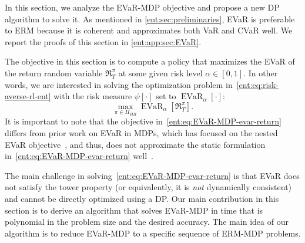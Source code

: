 \documentclass[twoside]{article}
\newcommand{\evar}[2]{\operatorname{EVaR}_{#1} \left[#2\right]}
\theoremstyle{plain}
\theoremstyle{definition}
\theoremstyle{remark}
\renewcommand{\cite}[1]{\citep{#1}}
\begin{document}
In this section, we analyze the EVaR-MDP objective and propose a new DP algorithm to solve it. As mentioned in \cref{ent:sec:preliminaries}, EVaR is preferable to ERM because it is coherent and approximates both VaR and CVaR well. We report the proofs of this section in \cref{ent:app:sec:EVaR}.

The objective in this section is to compute a policy that maximizes the EVaR of the return random variable $\mathfrak{R}_T^\pi$ at some given risk level $\alpha \in [0,1]$. In other words, we are interested in solving the optimization problem in~\eqref{ent:eq:risk-averse-rl-ent} with the risk measure $\psi[\cdot]$ set to $\evar{\alpha}{\cdot}$:
%
\begin{equation} \label{ent:eq:EVaR-MDP-evar-return}
\max_{\pi\in\Pi_{HR}}  \evar{\alpha}{ \mathfrak{R}_{T}^\pi } .
\end{equation}
%
It is important to note that the objective in~\eqref{ent:eq:EVaR-MDP-evar-return} differs from prior work on EVaR in MDPs, which has focused on the nested EVaR objective~\cite{Ahmadi2021a,Ahmadi2021b,Dixit2021}, and thus, does not approximate the static formulation in~\eqref{ent:eq:EVaR-MDP-evar-return} well~\cite{Iancu2015}.

The main challenge in solving~\eqref{ent:eq:EVaR-MDP-evar-return} is that EVaR does not satisfy the tower property (or equivalently, it is \emph{not} dynamically consistent) and cannot be directly optimized using a DP. Our main contribution in this section is to derive an algorithm that solves EVaR-MDP in time that is polynomial in the problem size and the desired accuracy. The main idea of our algorithm is to reduce EVaR-MDP to a specific sequence of ERM-MDP problems. 
\end{document}
